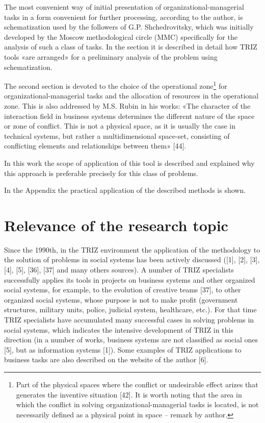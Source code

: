 \documentclass[11pt,a4paper]{book}
\begin{document}
The most convenient way of initial presentation of organizational-managerial
tasks in a form convenient for further processing, according to the author, is
schematization used by the followers of G.P. Shchedrovitsky, which was
initially developed by the Moscow methodological circle (MMC) specifically for
the analysis of such a class of tasks. In the section it is described in
detail how TRIZ tools «are arranged» for a preliminary analysis of the problem
using schematization.

The second section is devoted to the choice of the operational
zone\footnote{Part of the physical spaces where the conflict or undesirable
  effect arizes that generates the inventive situation [42]. It is worth
  noting that the area in which the conflict in solving
  organizational-managerial tasks is located, is not necessarily defined as a
  physical point in space -- remark by author.} for organizational-managerial
tasks and the allocation of resources in the operational zone. This is also
addressed by M.S. Rubin in his works: «The character of the interaction field
in business systems determines the different nature of the space or zone of
conflict. This is not a physical space, as it is usually the case in technical
systems, but rather a multidimensional space-set, consisting of conflicting
elements and relationships between them» [44].

In this work the scope of application of this tool is described and explained
why this approach is preferable precisely for this class of problems.

In the Appendix the practical application of the described methods is shown.

\section{Relevance of the research topic}

Since the 1990th, in the TRIZ environment the application of the methodology
to the solution of problems in social systems has been actively discussed
([1], [2], [3], [4], [5], [36], [37] and many others sources). A number of
TRIZ specialists successfully applies its tools in projects on business
systems and other organized social systems, for example, to the evolution of
creative teams [37], to other organized social systems, whose purpose is not
to make profit (government structures, military units, police, judicial
system, healthcare, etc.). For that time TRIZ specialists have accumulated
many successful cases in solving problems in social systems, which indicates
the intensive development of TRIZ in this direction (in a number of works,
business systems are not classified as social ones [5], but as information
systems [1]). Some examples of TRIZ applications to business tasks are also
described on the website of the author [6].
\end{document}
